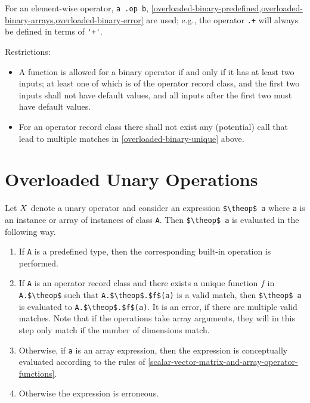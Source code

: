 For an element-wise operator, \lstinline!a .op b!, \cref{overloaded-binary-predefined,overloaded-binary-arrays,overloaded-binary-error} are used; e.g., the operator \lstinline!.+! will always be defined in terms of \lstinline!'+'!.

Restrictions:
\begin{itemize}
\item
  A function is allowed for a binary operator if and only if it has at least two inputs; at least one of which is of the operator record class, and the first two inputs shall not have default values, and all inputs after the first two must have default values.
\item
  For an operator record class there shall not exist any (potential) call that lead to multiple matches in \cref{overloaded-binary-unique} above.
\end{itemize}

\section{Overloaded Unary Operations}\label{overloaded-unary-operations}

Let $X$ denote a unary operator and consider an expression \lstinline!$\theop$ a! where \lstinline!a! is an instance or array of instances of class \lstinline!A!.
Then \lstinline!$\theop$ a! is evaluated in the following way.

\begin{enumerate}
\item
  If \lstinline!A! is a predefined type, then the corresponding built-in operation is performed.
\item\label{unary-operator-record-unique-match}
  If \lstinline!A! is an operator record class and there exists a unique function $f$ in \lstinline!A.$\theop$! such that \lstinline!A.$\theop$.$f$(a)! is a valid match, then \lstinline!$\theop$ a! is evaluated to \lstinline!A.$\theop$.$f$(a)!.
  It is an error, if there are multiple valid matches.
  Note that if the operations take array arguments, they will in this step only match if the number of dimensions match.
\item\label{overloaded-unary-array}
  Otherwise, if \lstinline!a! is an array expression, then the expression is conceptually evaluated according to the rules of \cref{scalar-vector-matrix-and-array-operator-functions}.
\item
  Otherwise the expression is erroneous.
\end{enumerate}

